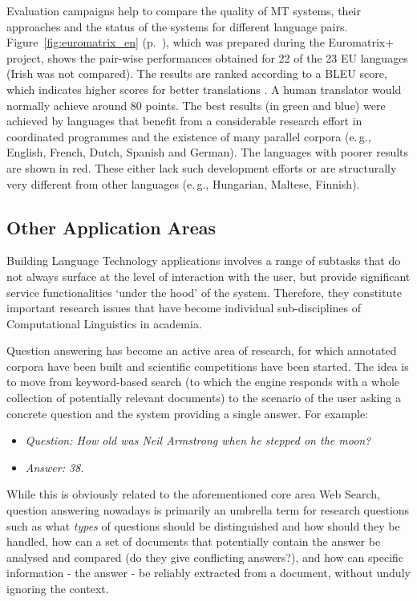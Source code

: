 \begin{multicols}{2}
Evaluation campaigns help to compare the quality of MT systems, their approaches and the status of the systems for different language pairs. Figure~\ref{fig:euromatrix_en} (p.~\pageref{fig:euromatrix_en}), which was prepared during the Euromatrix+ project, shows the pair-wise performances obtained for 22 of the 23 EU languages (Irish was not compared). The results are ranked according to a BLEU score, which indicates higher scores for better translations \cite{bleu1}. A human translator would normally achieve around 80 points. The best results (in green and blue) were achieved by languages that benefit from a considerable research effort in coordinated programmes and the existence of many parallel corpora (e.\,g., English, French, Dutch, Spanish and German). The languages with poorer results are shown in red. These either lack such development efforts or are structurally very different from other languages (e.\,g., Hungarian, Maltese, Finnish).

\subsection{Other Application Areas}
    Building Language Technology applications involves a range of subtasks that do not always surface at the level of interaction with the user,  but provide significant service functionalities ‘under the hood’ of the system. Therefore, they constitute important research issues that have become individual sub-disciplines of Computational Linguistics in academia. 

Question answering has become an active area of research, for which annotated corpora have been built and scientific competitions have been started. The idea is to move from keyword-based search (to which the engine responds with a whole collection of potentially relevant documents) to the scenario of the user asking a concrete question and the system providing a single answer. For example:

\begin{itemize}
\item[] \textit{Question: How old was Neil Armstrong when he stepped on the moon?}
\item[] \textit{Answer: 38.}
\end{itemize}

While this is obviously related to the aforementioned core area Web Search, question answering nowadays is primarily an umbrella term for research questions such as what \textit{types} of questions should be distinguished and how should they be handled, how can a set of documents that potentially contain the answer be analysed and compared (do they give conflicting answers?), and how can specific information - the answer - be reliably extracted from a document, without unduly ignoring the context. 


\end{multicols}
